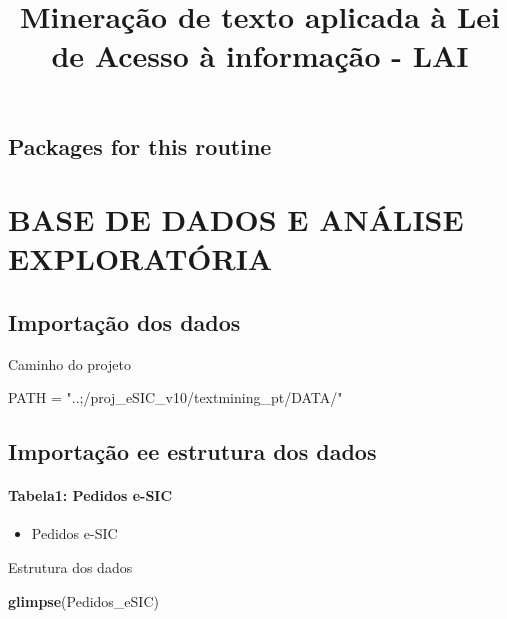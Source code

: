 \documentclass[]{article}
\title{Mineração de texto aplicada à Lei de Acesso à informação - LAI}
\author{}
\date{}
\newenvironment{Shaded}{\begin{snugshade}}{\end{snugshade}}
\newcommand{\KeywordTok}[1]{\textcolor[rgb]{0.13,0.29,0.53}{\textbf{#1}}}
\newcommand{\StringTok}[1]{\textcolor[rgb]{0.31,0.60,0.02}{#1}}
\newcommand{\NormalTok}[1]{#1}
\providecommand{\tightlist}{%
  \setlength{\itemsep}{0pt}\setlength{\parskip}{0pt}}
\let\oldparagraph\paragraph
\renewcommand{\paragraph}[1]{\oldparagraph{#1}\mbox{}}
\begin{document}
\maketitle

\subsection{Packages for this routine}\label{packages-for-this-routine}

\section{BASE DE DADOS E ANÁLISE
EXPLORATÓRIA}\label{base-de-dados-e-analise-exploratoria}

\subsection{Importação dos dados}\label{importacao-dos-dados}

Caminho do projeto

\begin{Shaded}
\begin{Highlighting}[]
\NormalTok{PATH = }\StringTok{"..;/proj_eSIC_v10/textmining_pt/DATA/"}
\end{Highlighting}
\end{Shaded}

\subsection{Importação ee estrutura dos
dados}\label{importacao-ee-estrutura-dos-dados}

\paragraph{Tabela1: Pedidos e-SIC}\label{tabela1-pedidos-e-sic}

\begin{itemize}
\tightlist
\item
  Pedidos e-SIC
\end{itemize}

Estrutura dos dados

\begin{Shaded}
\begin{Highlighting}[]
\KeywordTok{glimpse}\NormalTok{(Pedidos_eSIC)}
\end{Highlighting}
\end{Shaded}
\end{document}
